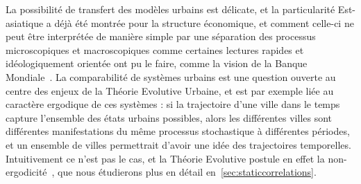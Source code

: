 La possibilité de transfert des modèles urbains est délicate, et la particularité Est-asiatique a déjà été montrée pour la structure économique, et comment celle-ci ne peut être interprétée de manière simple par une séparation des processus microscopiques et macroscopiques comme certaines lectures rapides et idéologiquement orientée ont pu le faire, comme la vision de la Banque Mondiale~\cite{amsden1994isn}. La comparabilité de systèmes urbains est une question ouverte au centre des enjeux de la Théorie Evolutive Urbaine, et est par exemple liée au caractère ergodique de ces systèmes : si la trajectoire d'une ville dans le temps capture l'ensemble des états urbains possibles, alors les différentes villes sont différentes manifestations du même processus stochastique à différentes périodes, et un ensemble de villes permettrait d'avoir une idée des trajectoires temporelles. Intuitivement ce n'est pas le cas, et la Théorie Evolutive postule en effet la non-ergodicité~\cite{pumain2012urban}, que nous étudierons plus en détail en~\ref{sec:staticcorrelations}.







\stars




